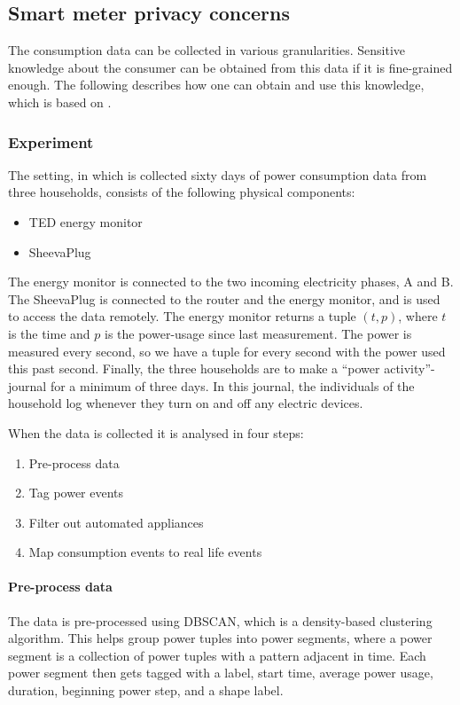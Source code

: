 \subsection{Smart meter privacy concerns}\label{smart_meter_privacy}
The consumption data can be collected in various granularities.
Sensitive knowledge about the consumer can be obtained from this data if it is fine-grained enough.
The following describes how one can obtain and use this knowledge, which is based on \citet{privacy_memoir}.

\subsubsection{Experiment}
The setting, in which is collected sixty days of power consumption data from three households, consists of the following physical components:
\begin{itemize}
\item TED energy monitor
\item SheevaPlug
\end{itemize}
The energy monitor is connected to the two incoming electricity phases, A and B.\cite{TED_installation_guide}
The SheevaPlug is connected to the router and the energy monitor, and is used to access the data remotely.
The energy monitor returns a tuple $(t,p)$, where $t$ is the time and $p$ is the power-usage since last measurement.
The power is measured every second, so we have a tuple for every second with the power used this past second.
Finally, the three households are to make a ``power activity''-journal for a minimum of three days.
In this journal, the individuals of the household log whenever they turn on and off any electric devices.

When the data is collected it is analysed in four steps:
\begin{enumerate}
\item Pre-process data
\item Tag power events
\item Filter out automated appliances
\item Map consumption events to real life events
\end{enumerate}

\paragraph{Pre-process data}
The data is pre-processed using DBSCAN, which is a density-based clustering algorithm.
This helps group power tuples into power segments, where a power segment is a collection of power tuples with a pattern adjacent in time.
Each power segment then gets tagged with a label, start time, average power usage, duration, beginning power step, and a shape label.

